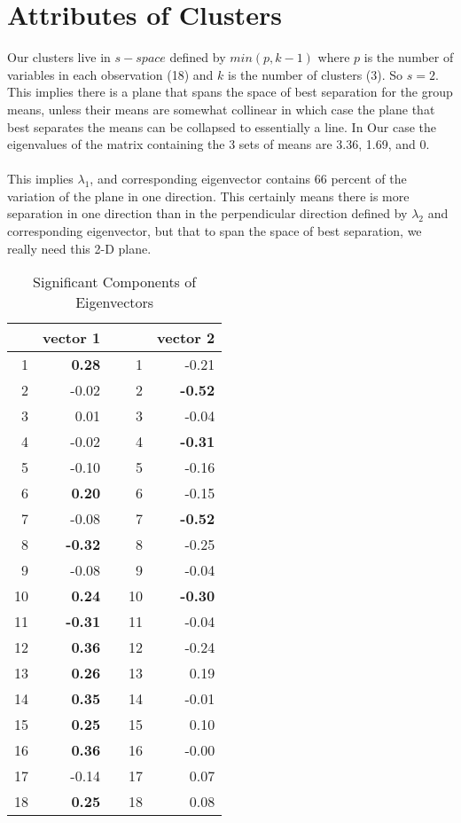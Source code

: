 \documentclass[11pt]{article}
\begin{document}
\section*{Attributes of Clusters}
Our clusters live in $s-space$ defined by $min(p,k-1)$ where $p$ is the number
of variables in each observation (18) and $k$ is the number of clusters (3). So
$s=2$. This implies there is a plane that spans the space of best separation for
the group means, unless their means are somewhat collinear in which case the
plane that best separates the means can be collapsed to essentially a line. In
Our case the eigenvalues of the matrix containing the 3 sets of means are 3.36,
1.69, and 0. 
\\
\\
This implies $\lambda_1$, and corresponding eigenvector contains 66 percent of
the variation of the plane in one direction. This certainly means there is more
separation in one direction than in the perpendicular direction defined by
$\lambda_2$ and corresponding eigenvector, but that to span the space of best
separation, we really need this 2-D plane.

\begin{table}[ht]
\centering
\begin{tabular}{rrlrr}
  \hline
 & vector 1 &  &  & vector 2 \\ 
  \hline
1 & \bf{0.28} &  & 1 & -0.21 \\ 
  2 & -0.02 &  & 2 & \bf{-0.52} \\ 
  3 & 0.01 &  & 3 & -0.04 \\ 
  4 & -0.02 &  & 4 & \bf{-0.31} \\ 
  5 & -0.10 &  & 5 & -0.16 \\ 
  6 & \bf{0.20} &  & 6 & -0.15 \\ 
  7 & -0.08 &  & 7 & \bf{-0.52} \\ 
  8 & \bf{-0.32} &  & 8 & -0.25 \\ 
  9 & -0.08 &  & 9 & -0.04 \\ 
  10 & \bf{0.24} &  & 10 & \bf{-0.30} \\ 
  11 & \bf{-0.31} &  & 11 & -0.04 \\ 
  12 & \bf{0.36} &  & 12 & -0.24 \\ 
  13 & \bf{0.26} &  & 13 & 0.19 \\ 
  14 & \bf{0.35} &  & 14 & -0.01 \\ 
  15 & \bf{0.25} &  & 15 & 0.10 \\ 
  16 & \bf{0.36} &  & 16 & -0.00 \\ 
  17 & -0.14 &  & 17 & 0.07 \\ 
  18 & \bf{0.25} &  & 18 & 0.08 \\ 
   \hline
\end{tabular}
\caption{Significant Components of Eigenvectors} 
\end{table}
\end{document}
